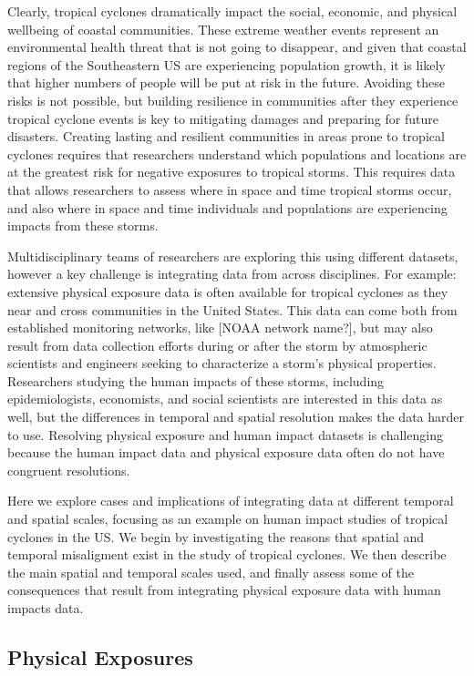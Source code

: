 \documentclass[
]{article}
\begin{document}
Clearly, tropical cyclones dramatically impact the social, economic, and
physical wellbeing of coastal communities. These extreme weather events
represent an environmental health threat that is not going to disappear,
and given that coastal regions of the Southeastern US are experiencing
population growth, it is likely that higher numbers of people will be
put at risk in the future. Avoiding these risks is not possible, but
building resilience in communities after they experience tropical
cyclone events is key to mitigating damages and preparing for future
disasters. Creating lasting and resilient communities in areas prone to
tropical cyclones requires that researchers understand which populations
and locations are at the greatest risk for negative exposures to
tropical storms. This requires data that allows researchers to assess
where in space and time tropical storms occur, and also where in space
and time individuals and populations are experiencing impacts from these
storms.

Multidisciplinary teams of researchers are exploring this using
different datasets, however a key challenge is integrating data from
across disciplines. For example: extensive physical exposure data is
often available for tropical cyclones as they near and cross communities
in the United States. This data can come both from established
monitoring networks, like {[}NOAA network name?{]}, but may also result
from data collection efforts during or after the storm by atmospheric
scientists and engineers seeking to characterize a storm's physical
properties. Researchers studying the human impacts of these storms,
including epidemiologists, economists, and social scientists are
interested in this data as well, but the differences in temporal and
spatial resolution makes the data harder to use. Resolving physical
exposure and human impact datasets is challenging because the human
impact data and physical exposure data often do not have congruent
resolutions.

Here we explore cases and implications of integrating data at different
temporal and spatial scales, focusing as an example on human impact
studies of tropical cyclones in the US. We begin by investigating the
reasons that spatial and temporal misaligment exist in the study of
tropical cyclones. We then describe the main spatial and temporal scales
used, and finally assess some of the consequences that result from
integrating physical exposure data with human impacts data.

\hypertarget{physical-exposures}{%
\subsection{Physical Exposures}\label{physical-exposures}}
\end{document}
